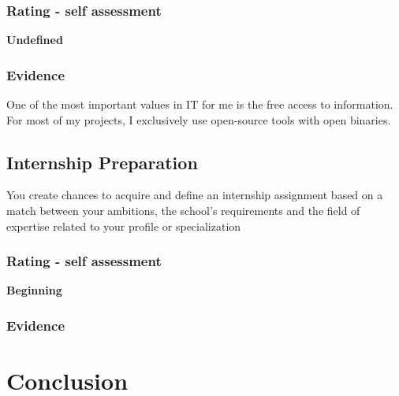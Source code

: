 \documentclass[a4paper, 11pt]{article}
\begin{document}
\pagebreak



\subsubsection{Rating - self assessment}
\textbf{Undefined} 
\subsubsection{Evidence}
One of the most important values in IT for me is the free access to information. For most of my projects, I exclusively use open-source tools with open binaries.

\subsection{Internship Preparation}
You create chances to acquire and define an internship assignment based on a match between your ambitions, the school's requirements and the field of expertise related to your profile or specialization

\subsubsection{Rating - self assessment}
\textbf{Beginning} 
\subsubsection{Evidence}



\section{Conclusion}
\end{document}
